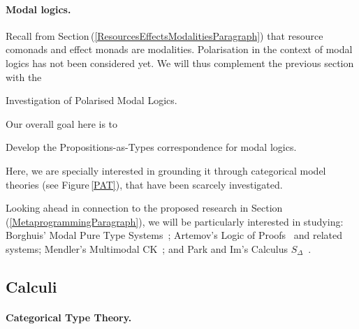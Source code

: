 \documentclass[11pt,twocolumn]{article}
\newcounter{CC}
\newenvironment{resenumerate}
  {\begin{list}{[\textbf{\arabic{CC}]}}
  {\usecounter{CC}
   \setlength{\topsep}{2pt}
   \setlength{\partopsep}{2pt}
   \setlength{\itemsep}{2.5pt}
   \setlength{\parsep}{2.5pt}
   \setlength{\leftmargin}{1.65em}
   \setlength{\labelwidth}{1.15em}
 }}
  {\end{list}}
\newcommand{\hide}[1]{}
\newcommand{\hidenote}{\hide}
\newcommand{\pref}[1]{\,(\ref{#1})}
\newcommand{\eg}{\emph{eg.}}
\begin{document}
\hidenote{polarised dialectica for program extraction motivated by
  polarised dialectica category construction}

\hidenote{Investigate relationship to Chuck Liang \& Dale Miller's work}

\hidenote{Investigate relationship to Oleg Kiselyov and Chung-chieh Shan's
  substructural type system for delimited control}

\paragraph{Modal logics.}
\label{ModalLogicsParagraph}

Recall from Section\pref{ResourcesEffectsModalitiesParagraph} that resource
comonads and effect monads are modalities.  Polarisation in the context of
modal logics has not been considered yet.  We will thus complement the
previous section with the 
\begin{resenumerate}\setcounter{CC}{0}
\item
  Investigation of Polarised Modal Logics.
\end{resenumerate}

Our overall goal here is to
\begin{resenumerate}\setcounter{CC}{1}
\item
  Develop the Propositions-as-Types correspondence for modal logics.
\end{resenumerate}
Here, we are specially interested in grounding it through categorical model
theories (see Figure\,\ref{PAT}), that have been scarcely investigated.

Looking ahead in connection to the proposed research in
Section\pref{MetaprogrammingParagraph}, we will be particularly interested
in studying: 
%
Borghuis' Modal Pure Type Systems~\cite{ModalPTS};
%
Artemov's Logic of Proofs~\cite{ArtemovLP} and related systems;
%
Mendler's Multimodal CK~\cite{MendlerMMCK};
and
%
Park and Im's Calculus $S_\Delta$~\cite{ParkIm}.

\subsection{Calculi}
\label{CalculiSubsection}

\hidenote{\ldots}

\setcounter{paragraph}{0}
\paragraph*{Categorical Type Theory.}
\end{document}
